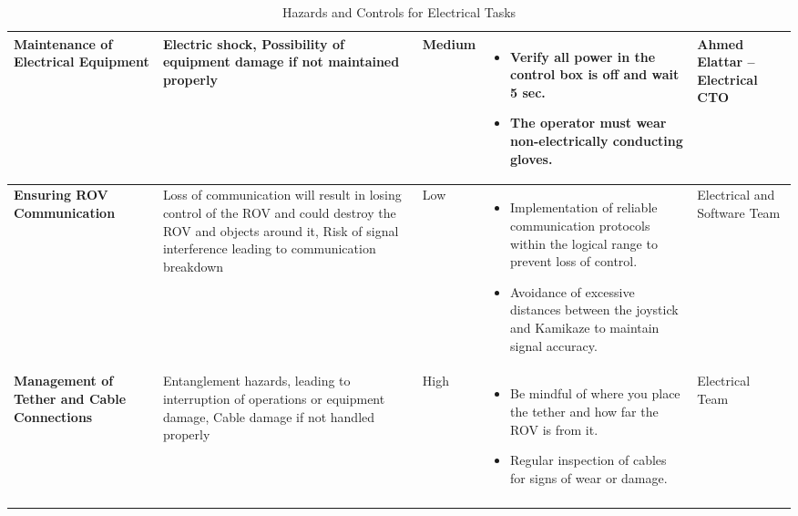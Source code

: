 \documentclass[conference, 12pt]{IEEEtran}
\begin{document}
\begin{longtable}{|>{\raggedright}p{3.5cm}|>{\raggedright}p{3.5cm}|p{1.5cm}|>{\raggedright}p{5cm}|p{3cm}|}
    \hline
    \textbf{Maintenance of Electrical Equipment}
        & Electric shock, Possibility of equipment damage if not maintained properly
        & Medium
        & \vspace{-0.8\baselineskip}\begin{itemize}[leftmargin=*]
            \item Verify all power in the control box is off and wait 5 sec.
            \item The operator must wear non-electrically conducting gloves.
        \end{itemize}
        & Ahmed Elattar – Electrical CTO \\
    \hline
    \textbf{Ensuring ROV Communication}
        & Loss of communication will result in losing control of the ROV and could destroy the ROV and objects around it, Risk of signal interference leading to communication breakdown
        & Low
        & \vspace{-0.8\baselineskip}\begin{itemize}[leftmargin=*]
            \item Implementation of reliable communication protocols within the logical range to prevent loss of control.
            \item Avoidance of excessive distances between the joystick and Kamikaze to maintain signal accuracy.
        \end{itemize}
        & {\raggedright Electrical and Software Team \par} \\
    \textbf{Management of Tether and Cable Connections}
        & Entanglement hazards, leading to interruption of operations or equipment damage, Cable damage if not handled properly
        & High
        & \vspace{-0.8\baselineskip}\begin{itemize}[leftmargin=*]
            \item Be mindful of where you place the tether and how far the ROV is from it.
            \item Regular inspection of cables for signs of wear or damage.
        \end{itemize}
        & Electrical Team \\
    \hline
    \caption{Hazards and Controls for Electrical Tasks}
\end{longtable}
\end{document}
